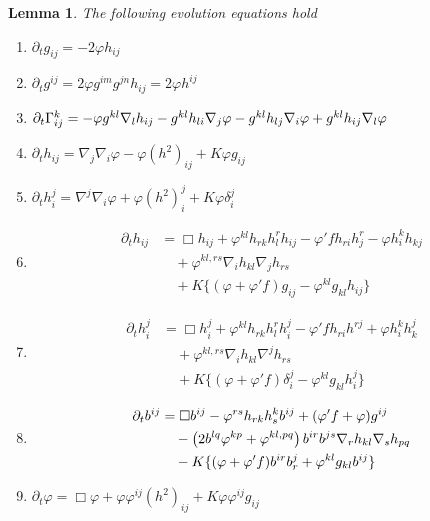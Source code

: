 \documentclass{amsart}
\newtheorem{lemma}[theorem]{Lemma}
\theoremstyle{definition}
\theoremstyle{remark}
\numberwithin{equation}{section}
\begin{document}
\begin{lemma}
\label{lem:evolution}
The following evolution equations hold
\begin{enumerate}
  \item $\partial_tg_{ij} = -2\varphi h_{ij}$
  \item $\partial_tg^{ij} = 2\varphi g^{im}g^{jn}h_{ij} = 2\varphi h^{ij}$
  \item $\partial_t {\Gamma}^{k}_{ij} = -\varphi g^{kl} \nabla_l h_{ij} - g^{kl} h_{li} \nabla_j \varphi - g^{kl} h_{lj} \nabla_i \varphi + g^{kl} h_{ij} \nabla_l \varphi$
  \item $\partial_t h_{ij} = \nabla_j\nabla_i\varphi-\varphi(h^2)_{ij}+K \varphi g_{ij}$
  \item $\partial_t h_i^j = \nabla^j\nabla_i\varphi+\varphi(h^2)_i^j+K \varphi\delta_i^j$
  \item \begin{align*}
\partial_t h_{ij} &= \Box h_{ij} + \varphi^{kl}h_{rk}h_l^rh_{ij} - \varphi'fh_{ri}h_j^r - \varphi h_i^kh_{kj} \\
& \quad + \varphi^{kl,rs}\nabla_ih_{kl}\nabla_jh_{rs} \\
& \quad + K \{(\varphi + \varphi'f) g_{ij} - \varphi^{kl}g_{kl}h_{ij}\}
\end{align*}
  \item \begin{align*}
\partial_t h_i^j &= \Box h_i^j + \varphi^{kl}h_{rk}h_l^rh_i^j - \varphi'fh_{ri}h^{rj} + \varphi h_i^kh_k^j \\
& \quad + \varphi^{kl,rs}\nabla_ih_{kl}\nabla^jh_{rs} \\
& \quad + K \{(\varphi + \varphi'f) \delta_i^j - \varphi^{kl}g_{kl}h_i^j\}
\end{align*}
  \item \begin{align*}
\partial_t b^{ij} &= \Box b^{ij} - \varphi^{rs}h_{rk}h^{k}_{s}b^{ij} + (\varphi'f+\varphi) g^{ij} \\  
& \quad - \left(2b^{lq}\varphi^{kp} + \varphi^{kl,pq}\right)b^{ir}b^{js} \nabla_r h_{kl} \nabla_s h_{pq} \\
& \quad - K \{(\varphi + \varphi'f) b^{ir}b^{j}_{r} + \varphi^{kl}g_{kl}b^{ij}\}
\end{align*}
  \item $\partial_t \varphi=\Box \varphi+\varphi\varphi^{ij}(h^2)_{ij} + K \varphi\varphi^{ij}g_{ij}$
\end{enumerate}
\end{lemma}
\end{document}

